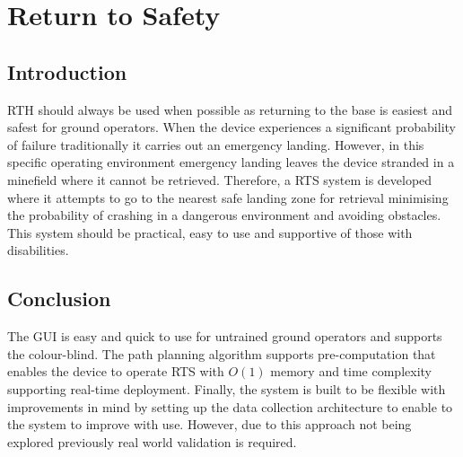 \newpage
{}
\section{Return to Safety} \label{Return to Safety}

\subsection{Introduction}\label{sub_section:tgt_RTS_intro}
\gls{RTH} should always be used when possible as returning to the base is easiest and safest for ground operators. When the device experiences a significant probability of failure traditionally it carries out an emergency landing. However, in this specific operating environment emergency landing leaves the device stranded in a minefield where it cannot be retrieved. Therefore, a \gls{RTS} system is developed where it attempts to go to the nearest safe landing zone for retrieval minimising the probability of crashing in a dangerous environment and avoiding obstacles. This system should be practical, easy to use and supportive of those with disabilities.





\subsection{Conclusion}
The \gls{GUI} is easy and quick to use for untrained ground operators and supports the colour-blind. The path planning algorithm supports pre-computation that enables the device to operate \gls{RTS} with $O(1)$ memory and time complexity supporting real-time deployment. Finally, the system is built to be flexible with improvements in mind by setting up the data collection architecture to enable to the system to improve with use. However, due to this approach not being explored previously real world validation is required.